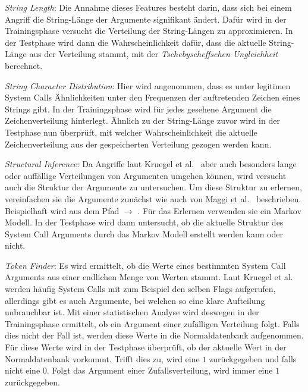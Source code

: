             \begin{description}
                \item \textit{String Length}: Die Annahme dieses Features besteht darin, dass sich bei einem Angriff die String-Länge der Argumente signifikant ändert.
                Dafür wird in der Trainingsphase versucht die Verteilung der String-Längen zu approximieren.
                In der Testphase wird dann die Wahrscheinlichkeit dafür, dass die aktuelle String-Länge aus der Verteilung stammt, mit der \textit{Tschebyscheffschen Ungleichheit} berechnet.
                
                \item \textit{String Character Distribution}: Hier wird angenommen, dass es unter legitimen System Calls Ähnlichkeiten unter den Frequenzen der auftretenden Zeichen eines Strings gibt.
                In der Trainingsphase wird für jedes gesehene Argument die Zeichenverteilung hinterlegt.
                Ähnlich zu der String-Länge zuvor wird in der Testphase nun überprüft, mit welcher Wahrscheinlichkeit die aktuelle Zeichenverteilung aus der gespeicherten Verteilung gezogen werden kann.

                \item \textit{Structural Inference:} Da Angriffe laut Kruegel et al.~\cite{ARGUMENTS} aber auch besonders lange oder auffällige Verteilungen von Argumenten umgehen können, wird versucht auch die Struktur der Argumente zu untersuchen.
                Um diese Struktur zu erlernen, vereinfachen sie die Argumente zunächst wie auch von Maggi et al.~\cite{ARGUMENTS2} beschrieben.
                Beispielhaft wird aus dem Pfad  $\longrightarrow$ .
                Für das Erlernen verwenden sie ein Markov Modell.
                In der Testphase wird dann untersucht, ob die aktuelle Struktur des System Call Arguments durch das Markov Modell erstellt werden kann oder nicht.

                \item \textit{Token Finder}: Es wird ermittelt, ob die Werte eines bestimmten System Call Arguments aus einer endlichen Menge von Werten stammt.
                Laut Kruegel et al.~\cite{ARGUMENTS} werden häufig System Calls mit zum Beispiel den selben Flags aufgerufen, allerdings gibt es auch Argumente, bei welchen so eine klare Aufteilung unbrauchbar ist.
                Mit einer statistischen Analyse wird deswegen in der Trainingsphase ermittelt, ob ein Argument einer zufälligen Verteilung folgt.
                Falls dies nicht der Fall ist, werden diese Werte in die Normaldatenbank aufgenommen.
                Für diese Werte wird in der Testphase überprüft, ob der aktuelle Wert in der Normaldatenbank vorkommt.
                Trifft dies zu, wird eine $1$ zurückgegeben und falls nicht eine $0$.
                Folgt das Argument einer Zufallsverteilung, wird immer eine $1$ zurückgegeben.
            \end{description}
